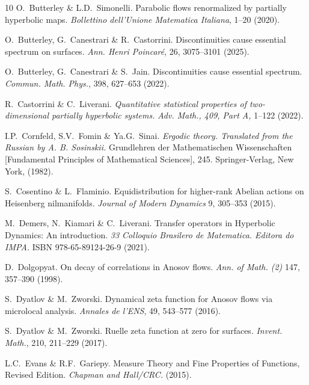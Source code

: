 \documentclass[a4paper,11pt]{amsart}
\theoremstyle{remark}
\begin{document}
\begin{thebibliography}{10}
    O.~Butterley \& L.D.~Simonelli.
    Parabolic flows renormalized by partially hyperbolic maps.
    \emph{Bollettino dell'Unione Matematica Italiana}, 1--20 (2020).

    O.~Butterley, G.~Canestrari \& R.~Castorrini.
    Discontinuities cause essential spectrum on surfaces.
    \emph{Ann. Henri Poincaré}, 26, 3075--3101 (2025).

    O.~Butterley, G.~Canestrari \& S.~Jain.
    Discontinuities cause essential spectrum.
    \emph{Commun. Math. Phys.}, 398, 627--653 (2022).

    R.~Castorrini \& C.~Liverani.
    \emph{Quantitative statistical properties of two-dimensional partially hyperbolic systems.}  
    \emph{Adv. Math., 409, Part A,} 1--122 (2022).

    I.P.~Cornfeld, S.V.~Fomin \& Ya.G.~Sinai.
    \emph{Ergodic theory. Translated from the Russian by A. B. Sosinskii.} 
    Grundlehren der Mathematischen Wissenschaften [Fundamental Principles of Mathematical Sciences], 245. Springer-Verlag, New York, (1982).

    S.~Cosentino \& L.~Flaminio.
    Equidistribution for higher-rank Abelian actions on Heisenberg nilmanifolds.
    \emph{Journal of Modern Dynamics} 9, 305--353 (2015).

    M.~Demers, N.~Kiamari \& C.~Liverani.  
    Transfer operators in Hyperbolic Dynamics: An introduction. 
    \emph{33 Colloquio Brasilero de Matematica. Editora do IMPA.} ISBN 978-65-89124-26-9 (2021).

    D.~Dolgopyat.
    On decay of correlations in Anosov flows.
    \emph{Ann. of Math. (2)} 147, 357--390 (1998).

    S.~Dyatlov \& M.~Zworski.
    \newblock Dynamical zeta function for Anosov flows via microlocal analysis.
    \newblock \emph{Annales de l'ENS}, 49, 543--577 (2016).

    S.~Dyatlov \& M.~Zworski.
    \newblock Ruelle zeta function at zero for surfaces.
    \newblock \emph{Invent. Math.}, 210, 211--229 (2017).

    L.C.~Evans \& R.F.~Gariepy.
    Measure Theory and Fine Properties of Functions, Revised Edition.
    \emph{Chapman and Hall/CRC.} (2015).


\end{thebibliography}
\end{document}
